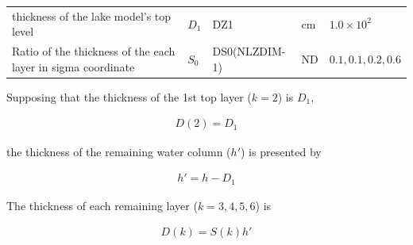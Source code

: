 \begin{longtable}[]{@{}lllll@{}}
\begin{minipage}[t]{0.37\columnwidth}\raggedright
thickness of the lake model's top level\strut
\end{minipage} & \begin{minipage}[t]{0.08\columnwidth}\raggedright
\(D_1\)\strut
\end{minipage} & \begin{minipage}[t]{0.09\columnwidth}\raggedright
DZ1\strut
\end{minipage} & \begin{minipage}[t]{0.09\columnwidth}\raggedright
\(\mathrm{cm}\)\strut
\end{minipage} & \begin{minipage}[t]{0.22\columnwidth}\raggedright
\(1.0\times 10^2\)\strut
\end{minipage}\tabularnewline
\begin{minipage}[t]{0.37\columnwidth}\raggedright
Ratio of the thickness of the each layer in sigma coordinate\strut
\end{minipage} & \begin{minipage}[t]{0.08\columnwidth}\raggedright
\(S_0\)\strut
\end{minipage} & \begin{minipage}[t]{0.09\columnwidth}\raggedright
DS0(NLZDIM-1)\strut
\end{minipage} & \begin{minipage}[t]{0.09\columnwidth}\raggedright
\(\mathrm{ND}\)\strut
\end{minipage} & \begin{minipage}[t]{0.22\columnwidth}\raggedright
\(0.1, 0.1, 0.2, 0.6\)\strut
\end{minipage}\tabularnewline
\bottomrule
\end{longtable}

Supposing that the thickness of the 1st top layer (\(k=2\)) is \(D_1\),

\begin{eqnarray}
    D(2) = D_1
\end{eqnarray}

the thickness of the remaining water column (\(h'\)) is presented by

\begin{eqnarray}
    h' = h - D_1
\end{eqnarray}

The thickness of each remaining layer (\(k=3,4,5,6\)) is

\begin{eqnarray}
    D(k) = S(k) {h'}
\end{eqnarray}

